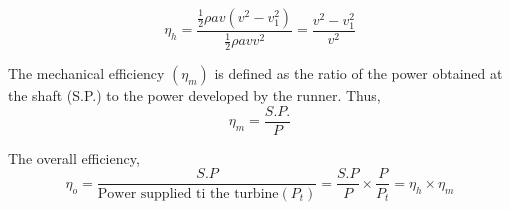 \documentclass{article}
\begin{document}
\begin{equation}
  \eta_h = \frac{\frac{1}{2} \rho a v \left(v^2-v_1^2\right)}{\frac{1}{2} \rho a v v^2} = \frac{v^2-v_1^2}{v^2} \label{eq:eq37}
\end{equation}

The mechanical efficiency $(\eta_m)$ is defined as the ratio of the power obtained at the shaft (S.P.) to the power developed by the runner. Thus,
\begin{equation}
  \eta_m = \frac{S.P.}{P} \label{eq:eq38} 
\end{equation}

The overall efficiency, 
\begin{equation}
  \eta_o = \frac{S.P}{\text{Power supplied ti the turbine} (P_t)} = \frac{S.P}{P} \times \frac{P}{P_t} = \eta_h \times \eta_m \label{eq:eq39}
\end{equation}
\end{document}

